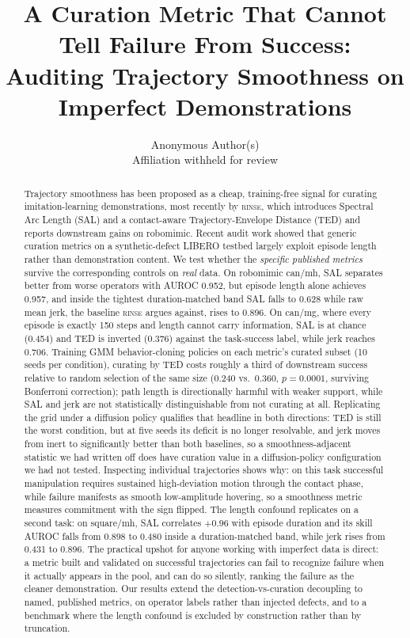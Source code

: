 \documentclass[10pt]{article}
\title{A Curation Metric That Cannot Tell Failure From Success:\\
Auditing Trajectory Smoothness on Imperfect Demonstrations}
\author{Anonymous Author(s)\\ \small Affiliation withheld for review}
\date{}
\newcommand{\rinse}{\textsc{rinse}}
\begin{document}
\maketitle

\begin{abstract}
Trajectory smoothness has been proposed as a cheap, training-free signal for
curating imitation-learning demonstrations, most recently by \rinse{}, which
introduces Spectral Arc Length (SAL) and a contact-aware Trajectory-Envelope
Distance (TED) and reports downstream gains on robomimic. Recent audit work
showed that generic curation metrics on a synthetic-defect LIBERO testbed
largely exploit episode length rather than demonstration content. We test
whether the \emph{specific published metrics} survive the corresponding
controls on \emph{real} data. On robomimic can/mh, SAL separates
better from worse operators with AUROC 0.952, but episode length alone
achieves 0.957, and inside the tightest duration-matched band SAL falls to
0.628 while raw mean jerk, the baseline \rinse{} argues
against, rises to 0.896. On can/mg, where every episode is exactly 150
steps and length cannot carry information, SAL is at chance (0.454) and TED
is inverted (0.376) against the task-success label, while jerk reaches
0.706. Training GMM behavior-cloning policies on each metric's curated
subset (10 seeds per condition), curating by TED costs roughly a third of
downstream success relative to random selection of the same size (0.240
vs.\ 0.360, $p{=}0.0001$, surviving Bonferroni correction); path length is
directionally harmful with weaker support, while SAL and jerk are not
statistically distinguishable from not curating at all. Replicating the grid
under a diffusion policy qualifies that headline in both directions: TED is
still the worst condition, but at five seeds its deficit is no longer
resolvable, and jerk moves from inert to significantly better than both
baselines, so a smoothness-adjacent statistic we had written off does have
curation value in a diffusion-policy configuration we had not tested.
Inspecting individual trajectories shows why: on this task successful
manipulation requires sustained high-deviation motion through the contact
phase, while failure manifests as smooth low-amplitude hovering, so a
smoothness metric measures commitment with the sign flipped. The length
confound replicates on a second task: on square/mh, SAL correlates $+0.96$
with episode duration and its skill AUROC falls from 0.898 to 0.480 inside a
duration-matched band, while jerk rises from 0.431 to 0.896. The practical
upshot for anyone working with imperfect data is direct: a metric built and
validated on successful trajectories can fail to recognize failure when it
actually appears in the pool, and can do so silently, ranking the failure as
the cleaner demonstration. Our results extend the detection-vs-curation
decoupling to named, published metrics, on operator labels rather than
injected defects, and to a benchmark where the length confound is excluded
by construction rather than by truncation.
\end{abstract}
\end{document}
